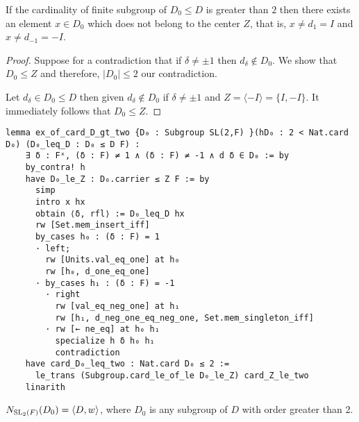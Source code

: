 \begin{lemma}
    \label{ex_of_card_D_gt_two}
    \leanok
    If the cardinality of finite subgroup of $D_0 \le D$ is greater than $2$ then there exists an element $x \in D_0$ which does not belong to the center $Z$, that is, $x \ne d_1 = I$ and $x \ne d_{-1} = -I$.
\end{lemma}
\begin{proof}
    \leanok
 Suppose for a contradiction that if $\delta \ne \pm 1$ then $d_\delta \notin D_0$. We show that $D_0 \le Z$ and therefore, $|D_0| \le 2$ our contradiction.
 
 Let $d_\delta \in D_0 \le D$ then given $d_\delta \notin D_0$ if $\delta \ne \pm 1$ and $Z = \langle -I\rangle = \{I, -I\}$. It immediately follows that $D_0 \le Z$.

\end{proof}
\begin{footnotesize}
\begin{verbatim}
lemma ex_of_card_D_gt_two {D₀ : Subgroup SL(2,F) }(hD₀ : 2 < Nat.card D₀) (D₀_leq_D : D₀ ≤ D F) :
    ∃ δ : Fˣ, (δ : F) ≠ 1 ∧ (δ : F) ≠ -1 ∧ d δ ∈ D₀ := by
    by_contra! h
    have D₀_le_Z : D₀.carrier ≤ Z F := by
      simp
      intro x hx
      obtain ⟨δ, rfl⟩ := D₀_leq_D hx
      rw [Set.mem_insert_iff]
      by_cases h₀ : (δ : F) = 1
      · left;
        rw [Units.val_eq_one] at h₀
        rw [h₀, d_one_eq_one]
      · by_cases h₁ : (δ : F) = -1
        · right
          rw [val_eq_neg_one] at h₁
          rw [h₁, d_neg_one_eq_neg_one, Set.mem_singleton_iff]
        · rw [← ne_eq] at h₀ h₁
          specialize h δ h₀ h₁
          contradiction
    have card_D₀_leq_two : Nat.card D₀ ≤ 2 :=
      le_trans (Subgroup.card_le_of_le D₀_le_Z) card_Z_le_two
    linarith
\end{verbatim}
\end{footnotesize}

\begin{proposition}
\label{normalizer_subgroup_D_eq_DW}
\leanok
    $N_{\operatorname{SL}_2(F)}(D_0) = \langle D , w \rangle$, where  $D_0$ is any subgroup of $D$ with order greater than 2. \\
    \end{proposition}

